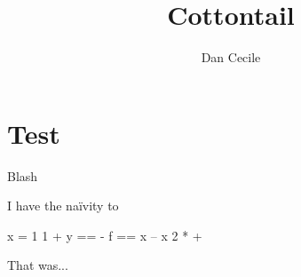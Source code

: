 \documentclass[draft]{memoir}
\begin{document}
\pagestyle{empty}

\title{Cottontail}
\author{Dan Cecile}
\maketitle



\frontmatter



\cleartooddpage
\tableofcontents

\mainmatter






\chapter{Test}
Blash \cite{GOTO} 

I have the naïvity to

\begin{ccode}
x = 1 1 +
y == -
f == x -- x 2 * +
\end{ccode}

That was...

\backmatter




\printindex

\end{document}
